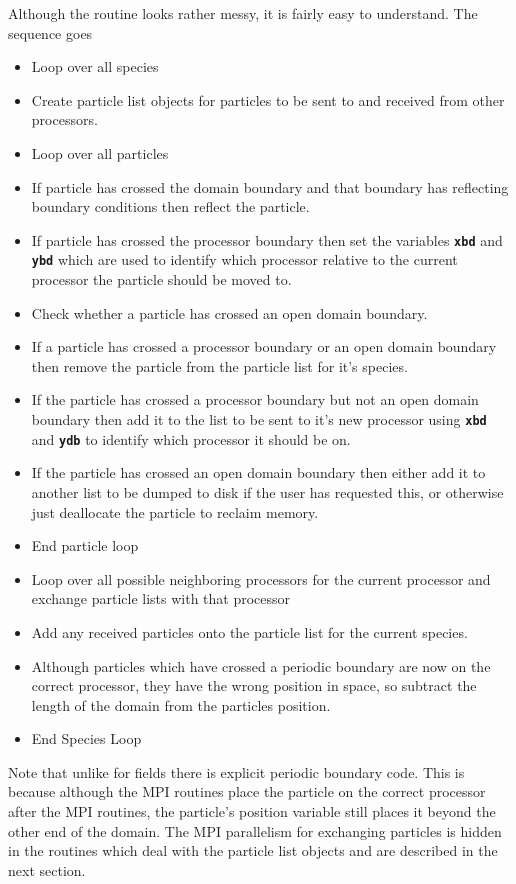 \documentclass[12pt,a4paper]{article}
\newcommand{\inlinecode}[1]{{\color{warwickred} \bf\texttt{#1}}}
\begin{document}
Although the routine looks rather messy, it is fairly easy to understand. The
sequence goes
\begin{itemize}
\item Loop over all species
\item Create particle list objects for particles to be sent to and received from
  other processors.
\item Loop over all particles
\item If particle has crossed the domain boundary and that boundary has
  reflecting boundary conditions then reflect the particle.
\item If particle has crossed the processor boundary then set the variables
  \inlinecode{xbd} and \inlinecode{ybd} which are used to identify which
  processor relative to the current processor the particle should be moved to.
\item Check whether a particle has crossed an open domain boundary.
\item If a particle has crossed a processor boundary or an open domain boundary
  then remove the particle from the particle list for it's species.
\item If the particle has crossed a processor boundary but not an open domain
  boundary then add it to the list to be sent to it's new processor using
  \inlinecode{xbd} and \inlinecode{ydb} to identify which processor it should
  be on.
\item If the particle has crossed an open domain boundary then either add it to
  another list to be dumped to disk if the user has requested this, or
  otherwise just deallocate the particle to reclaim memory.
\item End particle loop
\item Loop over all possible neighboring processors for the current processor
  and exchange particle lists with that processor
\item Add any received particles onto the particle list for the current
  species.
\item Although particles which have crossed a periodic boundary are now on the
  correct processor, they have the wrong position in space, so subtract the
  length of the domain from the particles position.
\item End Species Loop
\end{itemize}

Note that unlike for fields there is explicit periodic boundary code. This is
because although the MPI routines place the particle on the correct processor
after the MPI routines, the particle's position variable still places it beyond
the other end of the domain. The MPI parallelism for exchanging particles is
hidden in the routines which deal with the particle list objects and are
described in the next section.
\pagebreak
\end{document}
